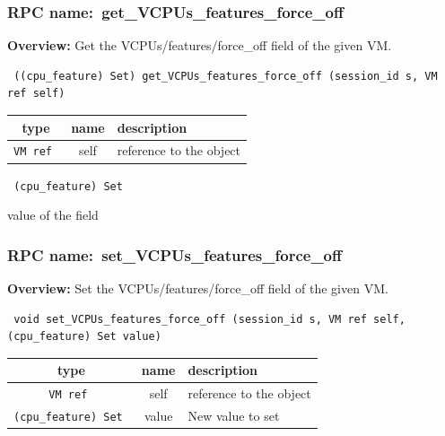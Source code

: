 \subsubsection{RPC name:~get\_VCPUs\_features\_force\_off}

{\bf Overview:} 
Get the VCPUs/features/force\_off field of the given VM.

\begin{verbatim} ((cpu_feature) Set) get_VCPUs_features_force_off (session_id s, VM ref self)\end{verbatim}



 
\vspace{0.3cm}
\begin{tabular}{|c|c|p{7cm}|}
 \hline
{\bf type} & {\bf name} & {\bf description} \\ \hline
{\tt VM ref } & self & reference to the object \\ \hline 

\end{tabular}

\vspace{0.3cm}

{\tt 
(cpu\_feature) Set
}


value of the field
\vspace{0.3cm}
\vspace{0.3cm}
\vspace{0.3cm}
\subsubsection{RPC name:~set\_VCPUs\_features\_force\_off}

{\bf Overview:} 
Set the VCPUs/features/force\_off field of the given VM.

\begin{verbatim} void set_VCPUs_features_force_off (session_id s, VM ref self, (cpu_feature) Set value)\end{verbatim}



 
\vspace{0.3cm}
\begin{tabular}{|c|c|p{7cm}|}
 \hline
{\bf type} & {\bf name} & {\bf description} \\ \hline
{\tt VM ref } & self & reference to the object \\ \hline 

{\tt (cpu\_feature) Set } & value & New value to set \\ \hline 

\end{tabular}

